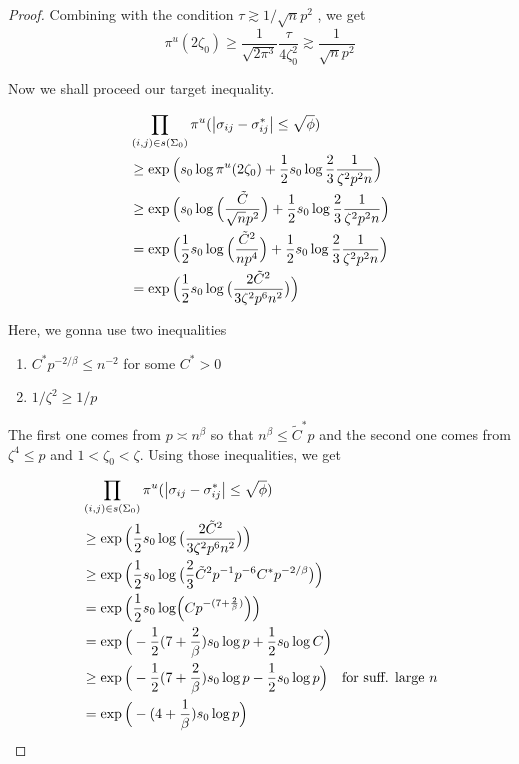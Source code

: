 \begin{proof}
    Combining with the condition $\tau \gtrsim 1/\sqrt{n}p^2$ , we get 
    \[\pi^u(2\zeta_0)\geq \frac{1}{\sqrt{2\pi^3}}\frac{\tau}{4\zeta_0^2} \gtrsim \frac{1}{\sqrt{n}p^2} \]

    Now we shall proceed our target inequality.

    \begin{align*}
        &\prod_{(i,j)\in s(\Sigma_0)}\pi^u(\abs{\sigma_{ij} - \sigma_{ij}^*}\leq \sqrt \phi)\\
        &\geq \exp\Big(s_0 \log \pi^u(2\zeta_0) + \frac 12 s_0 \log \frac 23\frac{1}{\zeta^2p^2n} \Big)  \\
        &\geq \exp\Big(s_0 \log \Big(\frac{\tilde C}{\sqrt{n}p^2} \Big) + \frac 12 s_0 \log \frac 23\frac{1}{\zeta^2p^2n} \Big) \\
        &= \exp\Big(\frac 12 s_0 \log \Big(\frac{\tilde C^2}{np^4} \Big) + \frac 12 s_0 \log \frac 23\frac{1}{\zeta^2p^2n} \Big) \\
        &= \exp \Big(\frac 12 s_0 \log \big(\frac{2\tilde{C}^2}{3\zeta^2p^6n^2} \big)\Big)
    \end{align*}

    Here, we gonna use two inequalities
    \begin{enumerate}
        \item $C^* p^{-2/\beta} \leq n^{-2}$ for some $C^*>0$
        \item $1/\zeta^2 \geq 1/p$
    \end{enumerate}

    The first one comes from $p\asymp n^\beta$ so that $n^\beta \leq \tilde C^*p$ and the second one comes from $\zeta^4\leq p$ and $1<\zeta_0 < \zeta$. Using those inequalities, we get

    \begin{align*}
        &\prod_{(i,j)\in s(\Sigma_0)}\pi^u(\abs{\sigma_{ij} - \sigma_{ij}^*}\leq \sqrt \phi)\\
        &\geq \exp \Big(\frac 12 s_0 \log \big(\frac{2\tilde{C}^2}{3\zeta^2p^6n^2} \big)\Big) \\
        &\geq \exp\Big(\frac 12 s_0 \log\big(\frac 23 \tilde C^2 p^{-1}p^{-6} C^* p^{-2/\beta} \big) \Big) \\
        &= \exp\Big(\frac 12 s_0 \log (Cp^{-(7+\frac{2}{\beta})}) \Big) \\
        &= \exp\Big(-\frac12(7+\frac 2\beta)s_0 \log p + \frac 12 s_0 \log C \Big) \\
        &\geq \exp\Big(-\frac12(7+\frac 2\beta)s_0 \log p - \frac 12 s_0 \log p \Big) \quad \text{for suff. large } n \\
        &= \exp\Big(-(4+\frac 1\beta)s_0\log p \Big)
    \end{align*}


\end{proof}
